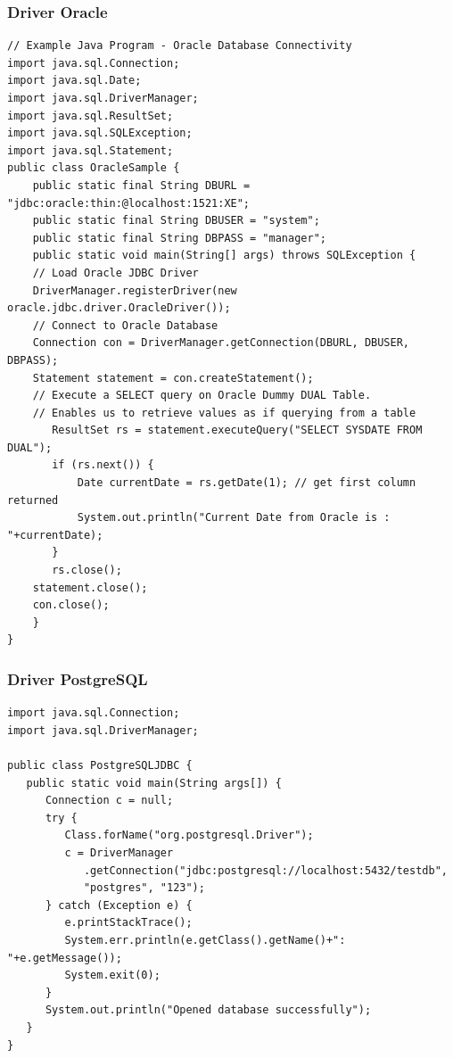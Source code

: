 \documentclass{beamer}
\begin{document}
\begin{frame}[fragile]
\frametitle{Driver Oracle}
\begin{tiny}
\begin{verbatim}
// Example Java Program - Oracle Database Connectivity
import java.sql.Connection;
import java.sql.Date;
import java.sql.DriverManager;
import java.sql.ResultSet;
import java.sql.SQLException;
import java.sql.Statement;
public class OracleSample {
    public static final String DBURL = "jdbc:oracle:thin:@localhost:1521:XE";
    public static final String DBUSER = "system";
    public static final String DBPASS = "manager";
    public static void main(String[] args) throws SQLException {
    // Load Oracle JDBC Driver
    DriverManager.registerDriver(new oracle.jdbc.driver.OracleDriver());
    // Connect to Oracle Database
    Connection con = DriverManager.getConnection(DBURL, DBUSER, DBPASS);
    Statement statement = con.createStatement();
    // Execute a SELECT query on Oracle Dummy DUAL Table.
    // Enables us to retrieve values as if querying from a table
       ResultSet rs = statement.executeQuery("SELECT SYSDATE FROM DUAL");
       if (rs.next()) {
           Date currentDate = rs.getDate(1); // get first column returned
           System.out.println("Current Date from Oracle is : "+currentDate);
       }
       rs.close();
    statement.close();
    con.close();
    }
}
\end{verbatim}
\end{tiny}
\end{frame}

\begin{frame}[fragile]
\frametitle{Driver PostgreSQL}
\begin{scriptsize}
\begin{verbatim}
import java.sql.Connection;
import java.sql.DriverManager;

public class PostgreSQLJDBC {
   public static void main(String args[]) {
      Connection c = null;
      try {
         Class.forName("org.postgresql.Driver");
         c = DriverManager
            .getConnection("jdbc:postgresql://localhost:5432/testdb",
            "postgres", "123");
      } catch (Exception e) {
         e.printStackTrace();
         System.err.println(e.getClass().getName()+": "+e.getMessage());
         System.exit(0);
      }
      System.out.println("Opened database successfully");
   }
}
\end{verbatim}
\end{scriptsize}
\end{frame}
\end{document}
